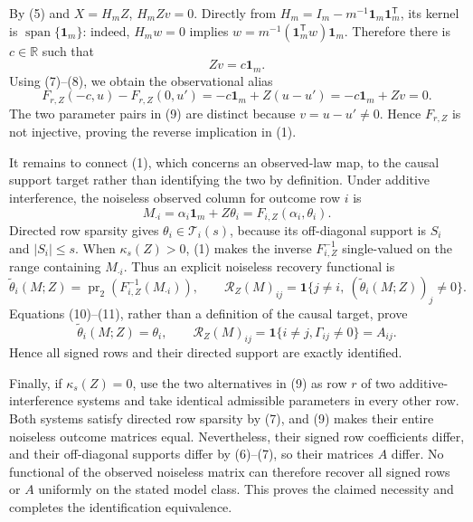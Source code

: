 By (5) and \(X=H_mZ\), \(H_mZv=0\).  Directly from
\(H_m=I_m-m^{-1}\mathbf 1_m\mathbf 1_m^{\mathsf T}\), its kernel is
\(\operatorname{span}\{\mathbf 1_m\}\): indeed, \(H_mw=0\) implies
\(w=m^{-1}(\mathbf 1_m^{\mathsf T}w)\mathbf 1_m\).  Therefore there is \(c\in\mathbb R\) such that
\[
Zv=c\mathbf 1_m. \tag{8}
\]
Using (7)--(8), we obtain the observational alias
\[
F_{r,Z}(-c,u)-F_{r,Z}(0,u')
=-c\mathbf 1_m+Z(u-u')
=-c\mathbf 1_m+Zv
=0. \tag{9}
\]
The two parameter pairs in (9) are distinct because \(v=u-u'\ne0\).  Hence \(F_{r,Z}\) is not injective, proving the reverse implication in (1).

It remains to connect (1), which concerns an observed-law map, to the causal support target rather than identifying the two by definition.  Under additive interference, the noiseless observed column for outcome row \(i\) is
\[
M_{\cdot i}=\alpha_i\mathbf 1_m+Z\theta_i=F_{i,Z}(\alpha_i,\theta_i). \tag{10}
\]
Directed row sparsity gives \(\theta_i\in\mathcal T_i(s)\), because its off-diagonal support is \(S_i\) and \(\lvert S_i\rvert\le s\).  When \(\kappa_s(Z)>0\), (1) makes the inverse \(F_{i,Z}^{-1}\) single-valued on the range containing \(M_{\cdot i}\).  Thus an explicit noiseless recovery functional is
\[
\widetilde\theta_i(M;Z)
=\operatorname{pr}_2\!\left(F_{i,Z}^{-1}(M_{\cdot i})\right),
\qquad
\mathcal R_Z(M)_{ij}
=\mathbf 1\{j\ne i,\ (\widetilde\theta_i(M;Z))_j\ne0\}. \tag{11}
\]
Equations (10)--(11), rather than a definition of the causal target, prove
\[
\widetilde\theta_i(M;Z)=\theta_i,
\qquad
\mathcal R_Z(M)_{ij}
=\mathbf 1\{i\ne j,\Gamma_{ij}\ne0\}=A_{ij}. \tag{12}
\]
Hence all signed rows and their directed support are exactly identified.

Finally, if \(\kappa_s(Z)=0\), use the two alternatives in (9) as row \(r\) of two additive-interference systems and take identical admissible parameters in every other row.  Both systems satisfy directed row sparsity by (7), and (9) makes their entire noiseless outcome matrices equal.  Nevertheless, their signed row coefficients differ, and their off-diagonal supports differ by (6)--(7), so their matrices \(A\) differ.  No functional of the observed noiseless matrix can therefore recover all signed rows or \(A\) uniformly on the stated model class.  This proves the claimed necessity and completes the identification equivalence.